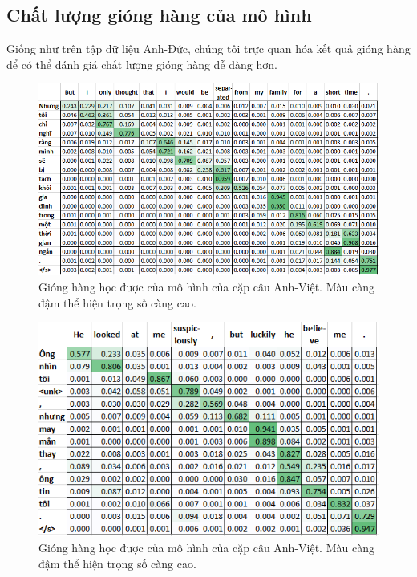 \subsection{Chất lượng gióng hàng của mô hình}
Giống như trên tập dữ liệu Anh-Đức, chúng tôi trực quan hóa kết quả gióng hàng để có thể đánh giá chất lượng gióng hàng dễ dàng hơn.

\begin{figure}
	\centering
	\includegraphics[width=1.0\textwidth]{en-vi_attn-weights_25.PNG}
	\caption[Gióng hàng học được của mô hình của cặp câu Anh-Việt.]{Gióng hàng học được của mô hình của cặp câu Anh-Việt. Màu càng đậm thể hiện trọng số càng cao.}
	\label{fig_en-vi_attn-weights_25}
\end{figure}

\begin{figure}
	\centering
	\includegraphics[width=1.0\textwidth]{en-vi_attn-weights_68.PNG}
	\caption[Gióng hàng học được của mô hình của cặp câu Anh-Việt.]{Gióng hàng học được của mô hình của cặp câu Anh-Việt. Màu càng đậm thể hiện trọng số càng cao.}
	\label{fig_en-vi_attn-weights_68}
\end{figure}

